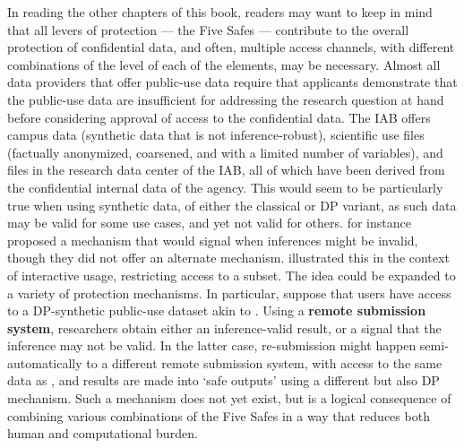 In reading the other chapters of this book, readers may want to keep in mind that all levers of protection --- the Five Safes --- contribute to the overall protection of confidential data, and often, multiple access channels, with different combinations of the level of each of the elements, may be necessary. Almost all data providers that offer public-use data require that applicants demonstrate that the public-use data are insufficient for addressing the research question at hand before considering approval of access to the confidential data. The IAB offers campus data (synthetic data that is not inference-robust), scientific use files (factually anonymized, coarsened, and with a limited number of variables), and files in the research data center of the IAB, all of which have been derived from the confidential internal data of the agency. This would seem to be particularly true when using synthetic data, of either the classical or DP variant, as such data may be valid for some use cases, and yet not valid for others. \cite{barrientos_providing_2018} for instance proposed a mechanism that would signal when inferences might be invalid, though they did not offer an alternate mechanism. \cite{dwork_fienberg_2018} illustrated this in the context of interactive usage, restricting access to a subset. The idea could be expanded to a variety of protection mechanisms. In particular, suppose that users have access to a DP-synthetic public-use dataset akin to \cite{barrientos_providing_2018}. Using a \textbf{remote submission system}, researchers obtain either an inference-valid result, or a signal that the inference may not be valid. In the latter case, re-submission might happen semi-automatically to a different remote submission system, with access to the same data as \cite{dwork_fienberg_2018}, and results are made into `safe outputs' using a different but also DP mechanism. Such a mechanism does not yet exist, but is a logical consequence of combining various combinations of the Five Safes in a way that reduces both human and computational burden.




